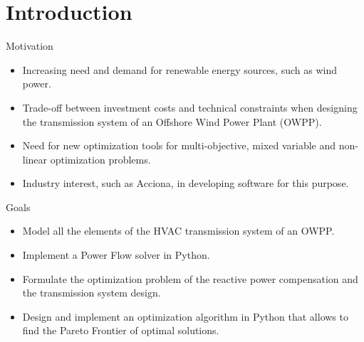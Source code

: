 
\section{Introduction}

\begin{frame}{}
    \tableofcontents[currentsection]
\end{frame}


\begin{frame}{Motivation}
\begin{itemize}
    \item Increasing need and demand for renewable energy sources, such as wind power.
    \item Trade-off between investment costs and technical constraints when designing the transmission system of an Offshore Wind Power Plant (OWPP).
    \item Need for new optimization tools for multi-objective, mixed variable and non-linear optimization problems.
    \item Industry interest, such as Acciona, in developing software for this purpose.
\end{itemize}
\end{frame}


\begin{frame}{Goals}
\begin{itemize}
\item Model all the elements of the HVAC transmission system of an OWPP.
\item Implement a Power Flow solver in Python.
\item Formulate the optimization problem of the reactive power compensation and the transmission system design.
\item Design and implement an optimization algorithm in Python that allows to find the Pareto Frontier of optimal solutions.
\end{itemize}
\end{frame}

